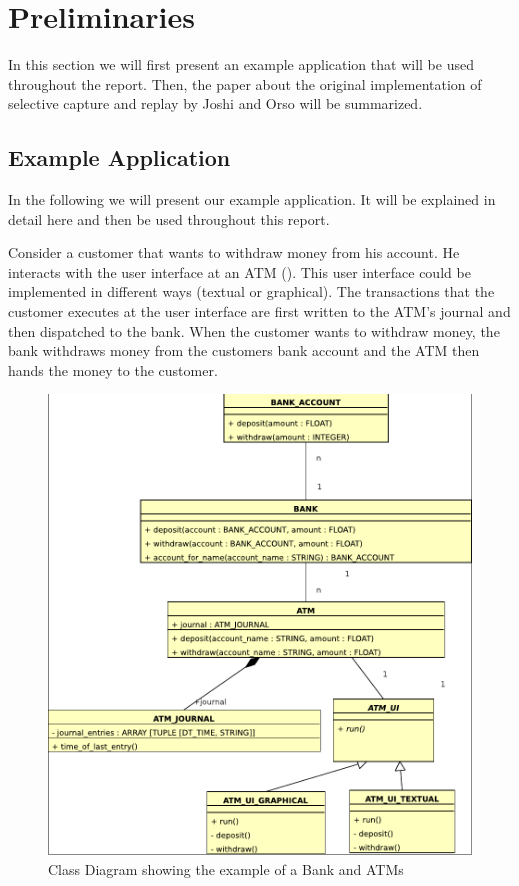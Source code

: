 \chapter{Preliminaries}
In this section we will first present an example application that will be used throughout the report. Then, the paper about the original implementation of selective capture and replay by Joshi and Orso \cite{orso05may} will be summarized.


\section{Example Application}
In the following we will present our example application. It will be explained in detail here and then be used throughout this report.

Consider a customer that wants to withdraw money from his account. He interacts with the user interface at an ATM (). This user interface could be implemented in different ways (textual or graphical). The transactions that the customer executes at the user interface are first written to the ATM's journal and then dispatched to the bank. When the customer wants to withdraw money, the bank withdraws money from the customers bank account and the ATM then hands the money to the customer.
 \begin{figure}[ht]
   \centering
   \includegraphics[width=1\textwidth]{illustrations/example_class_diagram}
   \caption{Class Diagram showing the example of a Bank and ATMs}
   \label{fig:example_class_diagram}
\end{figure}

